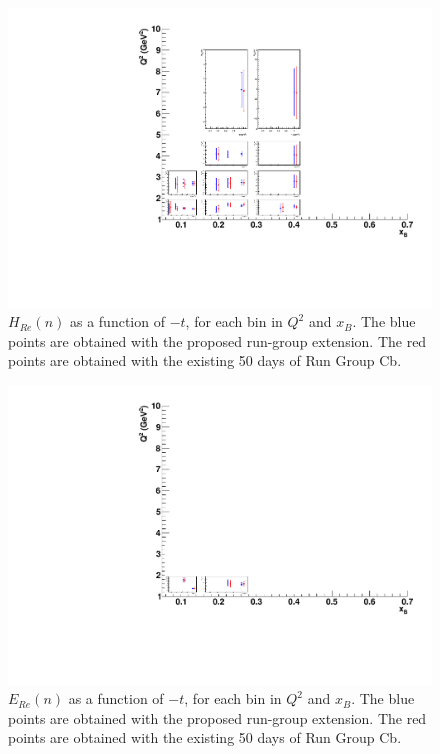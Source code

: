 \begin{figure}  
\begin{center}
\includegraphics[width=200mm]{mixed_CFF/100/mixed/CFF_hre_compare3.pdf}
\caption[$H_{Re}(n)$ as a function of $-t$]
{$H_{Re}(n)$ as a function of $-t$, for each bin in $Q^2$ and $x_B$. The blue points are obtained with the proposed run-group extension. The red points are obtained with the existing 50 days of Run Group Cb.}\label{cff_hre}
\end{center}
\end{figure}

\begin{figure}  
\begin{center}
\includegraphics[width=200mm]{mixed_CFF/100/mixed/CFF_ere_compare3.pdf}
\caption[$E_{Re}(n)$ as a function of $-t$]
{$E_{Re}(n)$ as a function of $-t$, for each bin in $Q^2$ and $x_B$. The blue points are obtained with the proposed run-group extension. The red points are obtained with the existing 50 days of Run Group Cb.}\label{cff_ere}
\end{center}
\end{figure}

